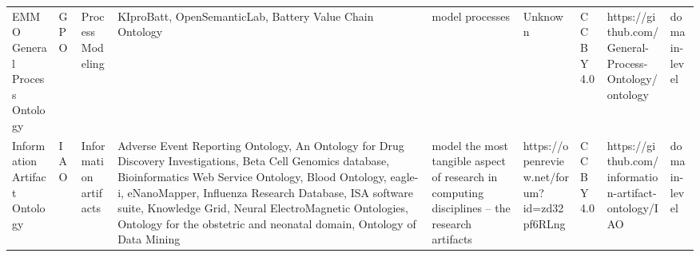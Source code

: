 \begin{tabular}{m{5cm}m{2cm}m{5cm}m{2cm}m{2cm}m{2cm}m{2cm}m{2cm}m{2cm}}
                                                    EMMO General Process Ontology &                     GPO &                            Process Modeling &                                                                                                                                                                                                                                                                                                             KIproBatt, OpenSemanticLab, Battery Value Chain Ontology &                                                                                                                                                                                                                                                                                                                                                                                        model processes &                                                                                                            Unknown &                                    CC BY 4.0 &                                              https://github.com/General-Process-Ontology/ontology  &      domain-level \\
                                                    Information Artifact Ontology &                     IAO &                       Information artifacts & Adverse Event Reporting Ontology, An Ontology for Drug Discovery Investigations, Beta Cell Genomics database, Bioinformatics Web Service Ontology, Blood Ontology, eagle-i, eNanoMapper, Influenza Research Database, ISA software suite, Knowledge Grid, Neural ElectroMagnetic Ontologies, Ontology for the obstetric and neonatal domain, Ontology of Data Mining &                                                                                                                                                                                                                                                                                                           model the most tangible aspect of research in computing disciplines – the research artifacts &                                                                        https://openreview.net/forum?id=zd32pf6RLng &                                    CC BY 4.0 &                                               https://github.com/information-artifact-ontology/IAO &      domain-level \\

\end{tabular}
